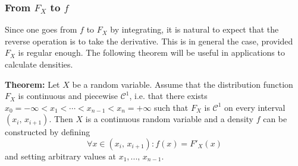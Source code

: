 \documentclass[a4paper]{extarticle}
\begin{document}
\subsubsection{From \(F_X\) to \(f\)}

Since one goes from \(f\) to \(F_X\) by integrating, it is natural to expect that the reverse operation is to take the derivative. This is in general the case, provided \(F_X\) is regular enough. The following theorem will be useful in applications to calculate densities.

\begin{tbox}
    \textbf{Theorem:} Let \(X\) be a random variable. Assume that the distribution function \(F_X\) is continuous and piecewise \(\mathcal{C}^1\), i.e. that there exists \(x_0 = - \infty < x_1 < \cdots < x_{n-1} < x_n = + \infty\) such that \(F_X\) is \(\mathcal{C}^1\) on every interval \((x_i, \, x_{i + 1})\). Then \(X\) is a continuous random variable and a density \(f\) can be constructed by defining
    \[
        \forall x \in (x_i, \, x_{i + 1}) : f(x) = F'_X(x)
    \]
    and setting arbitrary values at \(x_1,..., \, x_{n-1}\).
\end{tbox}
\end{document}

